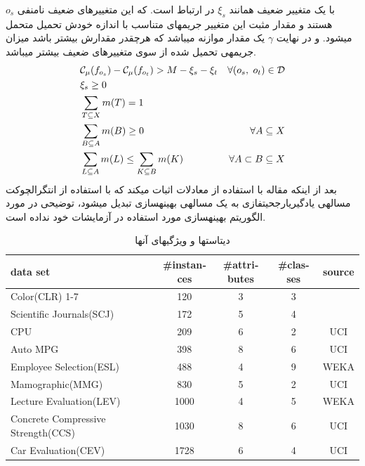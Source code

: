\documentclass[journal]{IEEEtran}
\newcommand{\نیمفاصله}{\halfspace}
\renewcommand{\ }{\halfspace}
\renewcommand{\یا}{یادگیری\ ارجحیت }
\newcommand{\یم}{یادگیری\ ماشین }
\renewcommand{\تر}{تابع رتبه\ بند }
\newcommand{\ار}{ارجحیت }
\renewcommand{\|}[1][.3em]{\hspace{#1}|\hspace{#1}}
\renewcommand{\,}[1][.3em]{,\hspace{#1}}
\begin{document}
$o_s$
با یک متغییر ضعیف همانند
$\xi_s$
در ارتباط است. که این متغییرهای ضعیف نامنفی هستند و مقدار مثبت این متغییر جریمه\ ای متناسب با اندازه خودش تحمیل متحمل می\ شود. و در نهایت
$\gamma$
یک مقدار موازنه می\ باشد که هرچقدر مقدارش بیشتر باشد میزان جریمه\ ی تحمیل شده از سوی متغییرهای ضعیف بیشتر می\ باشد.
\begin{align}\label{EQ:LEARNING_MU_COND_FIRST}
&\mathcal{C}_\mu(f_{o_s}) - \mathcal{C}_\mu(f_{o_t}) > M - \xi_s - \xi_t&\forall(o_s\,o_t)\in\mathcal{D}\\
&\xi_s \geq 0\\
&\sum_{T \subseteq X} m(T)= 1\\
&\sum_{B \subseteq A} m(B) \geq 0&\forall A \subseteq X\\
&\sum_{L \subseteq A} m(L) \leq \sum_{K \subseteq B} m(K)&\forall A \subset B \subseteq X\label{EQ:LEARNING_MU_COND_LAST}
\end{align}
بعد از این\ که مقاله با استفاده از معادلات اثبات می\ کند که با استفاده از انتگرال\ چوکت مساله\ ی یادگیری\ ارجحیت\ فازی به یک مساله\ ی بهینه\ سازی تبدیل می\ شود، توضیحی در مورد الگوریتم بهینه\ سازی مورد استفاده در آزمایشات خود نداده است.
\begin{table}[ht]
    \begin{latin}
    \begin{adjustwidth}{-.in}{0in}
    \centering
    \begin{tabular}{lcccc}
        \hline
        data set & {\#}instances & {\#}attributes & {\#}classes & source\\\hline
        Color(CLR) 1-7 & 120 & 3 & 3 & \cite{DATASET:COLOR}\\
        Scientific Journals(SCJ) & 172 & 5 & 4 & \cite{DATASET:JOURNAL}\\
        CPU & 209 & 6 & 2 & UCI\\
        Auto MPG & 398 & 8 & 6 & UCI\\
        Employee Selection(ESL) & 488 & 4 & 9 & WEKA\\
        Mamographic(MMG) & 830 & 5 & 2 & UCI\\
        Lecture Evaluation(LEV) & 1000 & 4 & 5 & WEKA\\
        Concrete Compressive Strength(CCS) & 1030 & 8 & 6 & UCI\\
        Car Evaluation(CEV) & 1728 & 6 & 4 & UCI\\\hline        
    \end{tabular}
    \end{adjustwidth}
    \end{latin}
    \caption{دیتاست\ ها و ویژگی\ های آن\ ها}\label{TAB:DATASETS_GEN_DESC}
\end{table}
\end{document}
